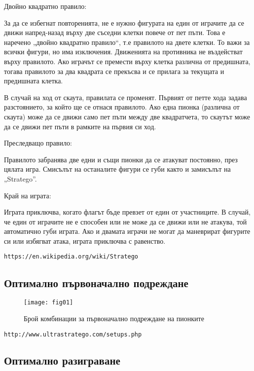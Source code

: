 Двойно квадратно правило:

За да се избегнат повторенията, не е нужно фигурата на един от играчите да се движи напред-назад върху две съседни клетки повече от пет пъти. Това е наречено „двойно квадратно правило“, т.е правилото на двете клетки. То важи за всички фигури, но има изключения. Движенията на противника не въздействат върху правилото. Ако играчът се премести върху клетка различна от предишната, тогава правилото за два квадрата се прекъсва и се прилага за текущата и предишната клетка.

В случай на ход от скаута, правилата се променят. Първият от петте хода задава разстоянието, за който ще се отнася правилото. Ако една пионка (различна от скаута) може да се движи само пет пъти между две квадратчета, то скаутът може да се движи пет пъти в рамките на първия си ход.

Преследващо правило:

Правилото забранява две едни и същи пионки да се атакуват постоянно, през цялата игра. Смисълът на останалите фигури се губи както и замисълът на „Stratego”.

Край на играта:

Играта приключва, когато флагът бъде превзет от един от участниците. В случай, че един от играчите не е способен или не може да се движи или не атакува, той автоматично губи играта. Ако и двамата играчи не могат да маневрират фигурите си или избягват атака, играта приключва с равенство. 

\begin{lstlisting}
https://en.wikipedia.org/wiki/Stratego
\end{lstlisting}

\subsection{Оптимално първоначално подреждане}

\begin{figure}[h!]
 \centering
 \texttt{[image: fig01]}
 \caption{Брой комбинации за първоначално подреждане на пионките \cite{arts01}}
\label{figure01}
\end{figure}
\FloatBarrier

\begin{lstlisting}
http://www.ultrastratego.com/setups.php
\end{lstlisting}

\subsection{Оптимално разиграване}


